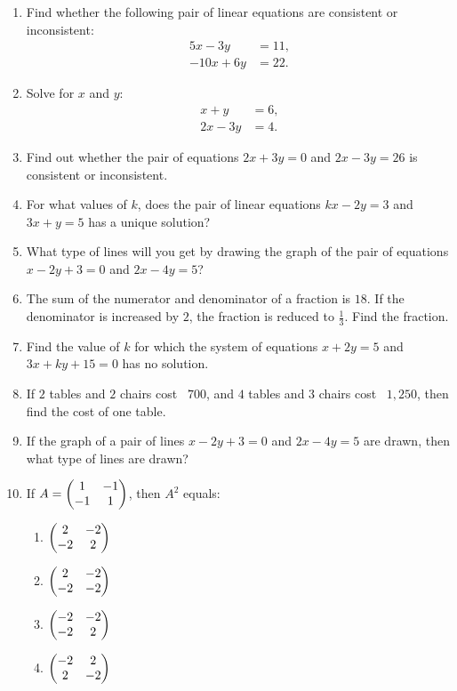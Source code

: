 \documentclass{article}
\begin{document}
\begin{enumerate}
    \item Find whether the following pair of linear equations are consistent or inconsistent:
    \begin{align*}
     5x - 3y &= 11, \\
    -10x + 6y &= 22.
    \end{align*}
    
    \item Solve for $x$ and $y$:
    \begin{align*}
    x + y &= 6, \\
    2x - 3y &= 4.
    \end{align*}
    
    \item Find out whether the pair of equations $2x + 3y = 0$ and $2x - 3y = 26$ is consistent or inconsistent.
    
    \item For what values of $k$, does the pair of linear equations $kx - 2y = 3$ and $3x + y = 5$ has a unique solution?
    
    \item What type of lines will you get by drawing the graph of the pair of equations $x - 2y + 3 = 0$ and $2x - 4y = 5$?
    
    \item The sum of the numerator and denominator of a fraction is $18$. If the denominator is increased by $2$, the fraction is reduced to $\frac{1}{3}$. Find the fraction.
    
    \item Find the value of $k$ for which the system of equations $x + 2y = 5$ and $3x + ky + 15 = 0$ has no solution.
    
    \item If $2$ tables and $2$ chairs cost \rupee~$700$, and $4$ tables and $3$ chairs cost \rupee~$1,250$, then find the cost of one table.
    
    \item If the graph of a  pair of lines $x - 2y + 3 = 0$ and $2x - 4y = 5$ are drawn, then what type of lines are drawn?

    \item If $A = \begin{pmatrix}1 & -1 \\ -1 & 1\end{pmatrix}$, then $A^2$ equals:
    \begin{enumerate}
        \item $\begin{pmatrix}2 & -2 \\ -2 & 2\end{pmatrix}$
        \item $\begin{pmatrix}2 & -2 \\ -2 & -2\end{pmatrix}$
        \item $\begin{pmatrix}-2 & -2 \\ -2 & 2\end{pmatrix}$
        \item $\begin{pmatrix}-2 & 2 \\ 2 & -2\end{pmatrix}$
    \end{enumerate}


\end{enumerate}
\end{document}

